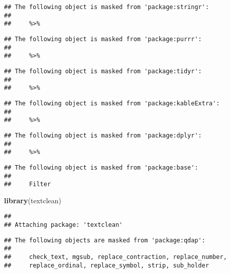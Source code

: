 \documentclass[]{article}
\newenvironment{Shaded}{\begin{snugshade}}{\end{snugshade}}
\newcommand{\KeywordTok}[1]{\textcolor[rgb]{0.13,0.29,0.53}{\textbf{#1}}}
\newcommand{\DataTypeTok}[1]{\textcolor[rgb]{0.13,0.29,0.53}{#1}}
\newcommand{\StringTok}[1]{\textcolor[rgb]{0.31,0.60,0.02}{#1}}
\newcommand{\OperatorTok}[1]{\textcolor[rgb]{0.81,0.36,0.00}{\textbf{#1}}}
\newcommand{\NormalTok}[1]{#1}
\begin{document}
\begin{verbatim}
## The following object is masked from 'package:stringr':
## 
##     %>%
\end{verbatim}

\begin{verbatim}
## The following object is masked from 'package:purrr':
## 
##     %>%
\end{verbatim}

\begin{verbatim}
## The following object is masked from 'package:tidyr':
## 
##     %>%
\end{verbatim}

\begin{verbatim}
## The following object is masked from 'package:kableExtra':
## 
##     %>%
\end{verbatim}

\begin{verbatim}
## The following object is masked from 'package:dplyr':
## 
##     %>%
\end{verbatim}

\begin{verbatim}
## The following object is masked from 'package:base':
## 
##     Filter
\end{verbatim}

\begin{Shaded}
\begin{Highlighting}[]
\KeywordTok{library}\NormalTok{(textclean)}
\end{Highlighting}
\end{Shaded}

\begin{verbatim}
## 
## Attaching package: 'textclean'
\end{verbatim}

\begin{verbatim}
## The following objects are masked from 'package:qdap':
## 
##     check_text, mgsub, replace_contraction, replace_number,
##     replace_ordinal, replace_symbol, strip, sub_holder
\end{verbatim}

\begin{Shaded}
\end{Shaded}
\end{document}
